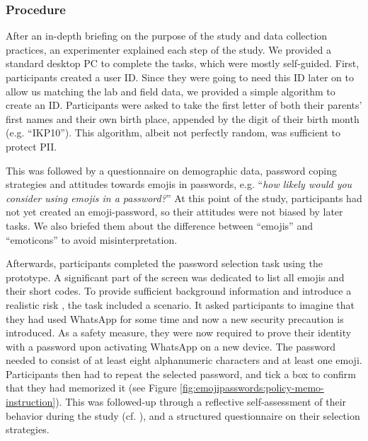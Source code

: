 \subsubsection{Procedure}
After an in-depth briefing on the purpose of the study and data collection practices, an experimenter explained each step of the study. We provided a standard desktop PC to complete the tasks, which were mostly self-guided. First, participants created a user ID. 
Since they were going to need this ID later on to allow us matching the lab and field data, we provided a simple algorithm to create an ID. Participants were asked to take the first letter of both their parents' first names and their own birth place, appended by the digit of their birth month (e.g. ``IKP10''). This algorithm, albeit not perfectly random, was sufficient to protect \acrlong{PII}.

This was followed by a questionnaire on demographic data, password coping strategies and attitudes towards emojis in passwords, e.g. ``\textit{how likely would you consider using emojis in a password?}'' At this point of the study, participants had not yet created an emoji-password, so their attitudes were not biased by later tasks. 
We also briefed them about the difference between ``emojis'' and ``emoticons'' to avoid misinterpretation. 

Afterwards, participants completed the password selection task using the prototype. A significant part of the screen was dedicated to list all emojis and their short codes. To provide sufficient background information and introduce a realistic risk \cite{Krol2016ExperimentDesign}, the task included a scenario. It asked participants to imagine that they had used WhatsApp for some time and now a new security precaution is introduced. As a safety measure, they were now required to prove their identity with a password upon activating WhatsApp on a new device. The password needed to consist of at least eight alphanumeric characters and at least one emoji. 
Participants then had to repeat the selected password, and tick a box to confirm that they had memorized it (see Figure \ref{fig:emojipasswords:policy-memo-instruction}). 
This was followed-up through a reflective self-assessment of their behavior during the study (cf. \cite{Fahl2013EcologicalValidityPasswordStudy}), and a structured questionnaire on their selection strategies. 

